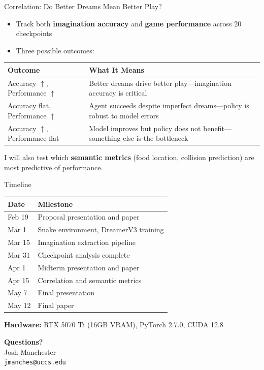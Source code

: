 \documentclass[aspectratio=169]{beamer}
\begin{document}
\begin{frame}{Correlation: Do Better Dreams Mean Better Play?}
\begin{itemize}
    \item Track both \textbf{imagination accuracy} and \textbf{game performance} across 20 checkpoints
    \item Three possible outcomes:
\end{itemize}

\vspace{0.5em}
\begin{tabular}{lp{9cm}}
\toprule
\textbf{Outcome} & \textbf{What It Means} \\
\midrule
Accuracy $\uparrow$, Performance $\uparrow$ & Better dreams drive better play---imagination accuracy is critical \\
Accuracy flat, Performance $\uparrow$ & Agent succeeds despite imperfect dreams---policy is robust to model errors \\
Accuracy $\uparrow$, Performance flat & Model improves but policy does not benefit---something else is the bottleneck \\
\bottomrule
\end{tabular}

\vspace{0.5em}
I will also test which \textbf{semantic metrics} (food location, collision prediction) are most predictive of performance.
\end{frame}

\begin{frame}{Timeline}
\begin{table}
\centering
\begin{tabular}{ll}
\toprule
\textbf{Date} & \textbf{Milestone} \\
\midrule
Feb 19 & Proposal presentation and paper \\
Mar 1 & Snake environment, DreamerV3 training \\
Mar 15 & Imagination extraction pipeline \\
Mar 31 & Checkpoint analysis complete \\
Apr 1 & Midterm presentation and paper \\
Apr 15 & Correlation and semantic metrics \\
May 7 & Final presentation \\
May 12 & Final paper \\
\bottomrule
\end{tabular}
\end{table}

\vspace{0.5em}
\textbf{Hardware:} RTX 5070 Ti (16GB VRAM), PyTorch 2.7.0, CUDA 12.8
\end{frame}

\begin{frame}
\begin{center}
\Large \textbf{Questions?}\\[2em]
\normalsize
Josh Manchester\\
\texttt{jmanches@uccs.edu}
\end{center}
\end{frame}
\end{document}
